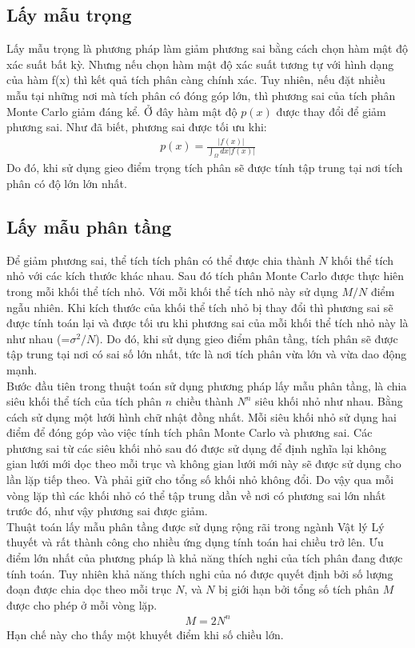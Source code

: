 \subsection{Lấy mẫu trọng}\label{subsec:3.2.1}
Lấy mẫu trọng là phương pháp làm giảm phương sai bằng cách chọn hàm mật độ xác suất bất kỳ. 
Nhưng nếu chọn hàm mật độ xác suất tương tự với hình dạng của hàm f(x) thì kết quả tích phân càng chính xác. 
Tuy nhiên, nếu đặt nhiều mẫu tại những nơi mà tích phân có đóng góp lớn, thì phương sai của tích phân Monte Carlo giảm đáng kể. 
Ở đây hàm mật độ $p(x)$ được thay đổi để giảm phương sai. Như đã biết, phương sai được tối ưu khi: 
\begin{align}
      p(x)=\frac{|f(x)|}{\int_\Omega{dx|f(x)|}}\label{ctmauqt}
  \end{align}
Do đó, khi sử dụng gieo điểm trọng tích phân sẽ được tính tập trung tại nơi tích phân có độ lớn lớn nhất.\par
\subsection{Lấy mẫu phân tầng}\label{subsec:3.2.2}
Để giảm phương sai, thể tích tích phân có thể được chia thành $N$ khối thể tích nhỏ với các kích thước khác nhau. 
Sau đó tích phân Monte Carlo được thực hiên trong mỗi khối thể tích nhỏ. 
Với mỗi khối thể tích nhỏ này sử dụng $M/N$ điểm ngẫu nhiên. 
Khi kích thước của khối thể tích nhỏ bị thay đổi thì phương sai sẽ được tính toán lại và được tối ưu khi phương sai của mỗi khối thể tích nhỏ này là như nhau (=$\sigma^2/N$). 
Do đó, khi sử dụng gieo điểm phân tầng, tích phân sẽ được tập trung tại nơi có sai số lớn nhất, 
tức là nơi tích phân vừa lớn và vừa dao động mạnh.\\
Bước đầu tiên trong thuật toán sử dụng phương pháp lấy mẫu phân tầng, là chia siêu khối thể tích của tích phân $n$ chiều thành $N^n$ siêu khối nhỏ như nhau. 
Bằng cách sử dụng một lưới hình chữ nhật đồng nhất. 
Mỗi siêu khối nhỏ sử dụng hai điểm để đóng góp vào việc tính tích phân Monte Carlo và phương sai. 
Các phương sai từ các siêu khối nhỏ sau đó được sử dụng để định nghĩa lại không gian lưới mới dọc theo mỗi trục 
và không gian lưới mới này sẽ được sử dụng cho lần lặp tiếp theo. 
Và phải giữ cho tổng số khối nhỏ không đổi. 
Do vậy qua mỗi vòng lặp thì các khối nhỏ có thể tập trung dần về nơi có phương sai lớn nhất trước đó, 
như vậy phương sai được giảm.\\
Thuật toán lấy mẫu phân tầng được sử dụng rộng rãi trong ngành Vật lý Lý thuyết và rất thành công cho nhiều ứng dụng tính toán hai chiều trở lên. 
Ưu điểm lớn nhất của phương pháp là khả năng thích nghi của tích phân đang được tính toán. 
Tuy nhiên khả năng thích nghi của nó được quyết định bởi số lượng đoạn được chia dọc theo mỗi trục $N$,
và $N$ bị giới hạn bởi tổng số tích phân $M$ được cho phép ở mỗi vòng lặp.
\begin{align}
      M=2N^n
  \end{align}
Hạn chế này cho thấy một khuyết điểm khi số chiều lớn.
